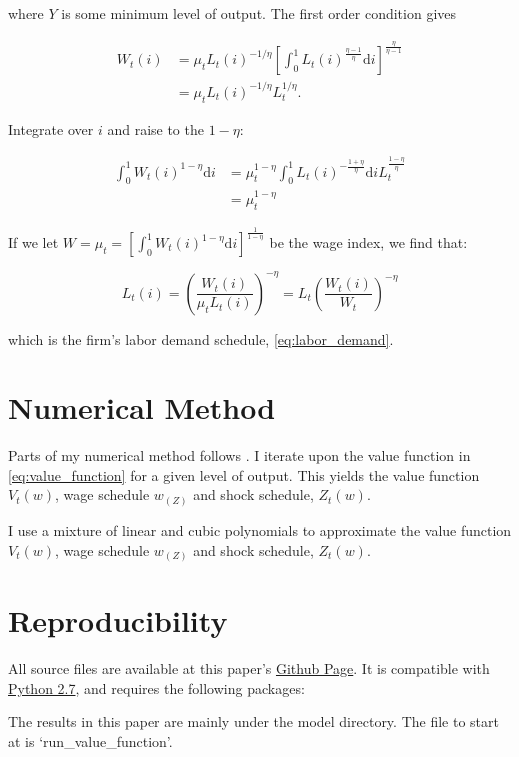 \documentclass[12pt,a4paper]{scrartcl}            %
\begin{document}
where $Y$ is some minimum level of output.  The first order condition gives

\begin{equation}
    \label{eqa:firms_foc}
    \begin{aligned}
        W_t(i) &= \mu_t L_t(i)^{-1 / \eta} \left[ \int_{0}^{1} \! L_t(i)^{\frac{\eta - 1}{\eta}} \mathrm{d}i \right]^{\frac{\eta}{\eta - 1}}\\
               &= \mu_t L_t(i)^{-1 / \eta} L_t^{1 / \eta}.
    \end{aligned}
\end{equation}

Integrate over $i$ and raise to the $1 - \eta$:

\begin{equation}
    \label{eqa:firms_foc2}
    \begin{aligned}
        \int_{0}^{1} \! W_t(i)^{1 - \eta} \mathrm{d}i &= \mu_t^{1 - \eta} \int_{0}^{1} \! L_t(i)^{-\frac{1 + \eta}{\eta}} \mathrm{d}i L_t^{\frac{1 - \eta}{\eta}}\\
                                                      &= \mu_t^{1 - \eta}
    \end{aligned}
\end{equation}

If we let $W = \mu_t = \left[ \int_{0}^{1} \! W_t(i)^{1 - \eta} \mathrm{d}i \right]^{\frac{1}{1 - \eta}}$ be the wage index, we find that:

\begin{equation}
    \label{eqa:firms_foc3}
    L_t(i) = \left(\frac{W_t(i)}{\mu_t L_t(i)}\right)^{-\eta} = L_t \left( \frac{W_t(i)}{W_t} \right)^{-\eta}
\end{equation}

which is the firm's labor demand schedule, \ref{eq:labor_demand}.
\section{Numerical Method}

Parts of my numerical method follows \cite{daly_hobijn_2013}.
I iterate upon the value function in \ref{eq:value_function} for a given level of output.
This yields the value function $V_t(w)$, wage schedule $w_(Z)$ and shock schedule, $Z_t(w)$.

I use a mixture of linear and cubic polynomials to approximate the value function $V_t(w)$, wage schedule $w_(Z)$ and shock schedule, $Z_t(w)$.


\section{Reproducibility}

All source files are available at this paper's \href{https://github.com/tomAugspurger/dnwr-zlb}{Github Page}.
It is compatible with \href{http://python.org/download/releases/2.7.5/}{Python 2.7}, and requires the following packages:


The results in this paper are mainly under the model directory.
The file to start at is `run\_value\_function'.
\end{document}
